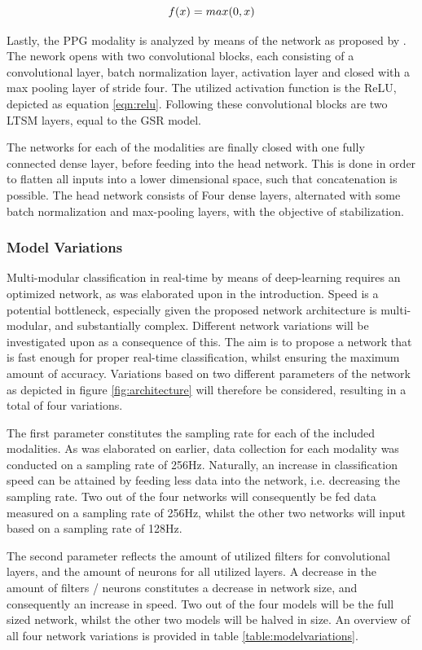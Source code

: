 \documentclass[12pt]{article}
\begin{document}
\begin{equation} 
\label{eqn:relu}
f(x)=max(0,x)
\bigskip
\end{equation}

Lastly, the PPG modality is analyzed by means of the network as proposed by . The nework opens with two convolutional blocks, each consisting of a convolutional layer, batch normalization layer, activation layer and closed with a max pooling layer of stride four. The utilized activation function is the ReLU, depicted as equation \ref{eqn:relu}. Following these convolutional blocks are two LTSM layers, equal to the GSR model. 

The networks for each of the modalities are finally closed with one fully connected dense layer, before feeding into the head network. This is done in order to flatten all inputs into a lower dimensional space, such that concatenation is possible. The head network consists of Four dense layers, alternated with some batch normalization and max-pooling layers, with the objective of stabilization. 

\subsubsection{Model Variations}
Multi-modular classification in real-time by means of deep-learning requires an optimized network, as was elaborated upon in the introduction. Speed is a potential bottleneck, especially given the proposed network architecture is multi-modular, and substantially  complex. Different network variations will be investigated upon as a consequence of this. The aim is to propose a network that is fast enough for proper real-time classification, whilst ensuring the maximum amount of accuracy. Variations based on two different parameters of the network as depicted in figure \ref{fig:architecture} will therefore be considered, resulting in a total of four variations. 

The first parameter constitutes the sampling rate for each of the included modalities. As was elaborated on earlier, data collection for each modality was conducted on a sampling rate of 256Hz. Naturally, an increase in classification speed can be attained by feeding less data into the network, i.e. decreasing the sampling rate. Two out of the four networks will consequently be fed data measured on a sampling rate of 256Hz, whilst the other two networks will input based on a sampling rate of 128Hz. 

The second parameter reflects the amount of utilized filters for convolutional layers, and the amount of neurons for all utilized layers. A decrease in the amount of filters / neurons constitutes a decrease in network size, and consequently an increase in speed. Two out of the four models will be the full sized network, whilst the other two models will be halved in size. An overview of all four network variations is provided in table \ref{table:modelvariations}.
\end{document}
